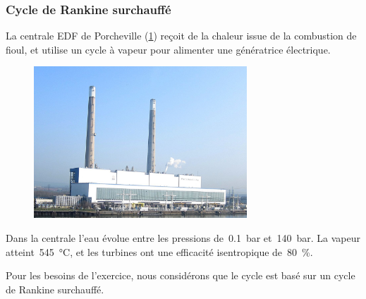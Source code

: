 \begin{boiboiboite}
	\propeau
	\propair
\end{boiboiboite}

\subsubsection{Cycle de Rankine surchauffé}
\label{exo_porcheville_rankine}

	La centrale EDF de Porcheville (\cref{fig_porcheville}) reçoit de la chaleur issue de la combustion de fioul, et utilise un cycle à vapeur pour alimenter une génératrice électrique.
	
	\begin{figure}
		\begin{center}
			\includegraphics[width=8cm]{images/porcheville.jpg}
			\vspace{-0.5cm}%
		\end{center}
		\label{fig_porcheville}
	\end{figure}
	
	Dans la centrale l’eau évolue entre les pressions de~\SI{0,1}{\bar} et~\SI{140}{\bar}. La vapeur atteint~\SI{545}{\degreeCelsius}, et les turbines ont une efficacité isentropique de~\SI{80}{\percent}.

	Pour les besoins de l’exercice, nous considérons que le cycle est basé sur un cycle de Rankine surchauffé.
	
